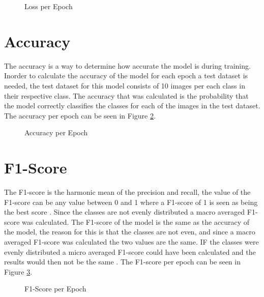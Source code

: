 \documentclass[a4paper,oneside,11pt]{book}
\begin{document}
\begin{figure}[h]
    \centering
    \caption{Loss per Epoch}
    \label{figLoss}
\end{figure}

\section{Accuracy}

The accuracy is a way to determine how accurate the model is during training. Inorder to calculate the accuracy of the model for each epoch a test dataset is needed, the test dataset for this model consists of 10 images per each class in their respective class. The accuracy that was calculated is the probability that the model correctly classifies the classes for each of the images in the test dataset. The accuracy per epoch can be seen in Figure \ref{figAccuracy}.

\begin{figure}[h]
    \centering
    \caption{Accuracy per Epoch}
    \label{figAccuracy}
\end{figure}

\section{F1-Score}

The F1-score is the harmonic mean of the precision and recall, the value of the F1-score can be any value between 0 and 1 where a F1-score of 1 is seen as being the best score \citep{humphrey2022machine}. Since the classes are not evenly distributed a macro averaged F1-score was calculated. The F1-score of the model is the same as the accuracy of the model, the reason for this is that the classes are not even, and since a macro averaged F1-score was calculated the two values are the same. IF the classes were evenly distributed a micro averaged F1-score could have been calculated and the results would then not be the same \citep{takahashi2022confidence}. The F1-score per epoch can be seen in Figure \ref{figF1-Score}.

\begin{figure}[h]
    \centering
    \caption{F1-Score per Epoch}
    \label{figF1-Score}
\end{figure}
\end{document}
